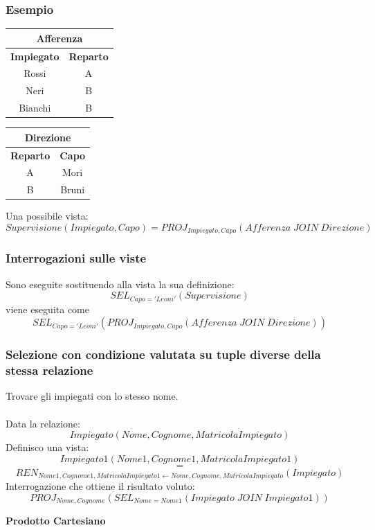 \documentclass[../main.tex]{subfiles}
\begin{document}
	\subsubsection{Esempio}
	\begin{center}
		\begin{tabular}{ |c|c| }
			\hline
			\multicolumn{2}{|c|}{Afferenza}\\
			\hline
			\textbf{Impiegato} & \textbf{Reparto} \\
			\hline
			Rossi & A\\
			Neri & B\\
			Bianchi & B\\
			\hline
		\end{tabular}
		\begin{tabular}{ |c|c| }
			\hline
			\multicolumn{2}{|c|}{Direzione}\\
			\hline
			\textbf{Reparto} & \textbf{Capo} \\
			\hline
			A & Mori\\
			B & Bruni\\
			\hline
		\end{tabular}
	\end{center}
	Una possibile vista:
	\[Supervisione(Impiegato, Capo) = PROJ_{Impiegato,Capo} (Afferenza \; JOIN \; Direzione)\]
	\subsubsection{Interrogazioni sulle viste}
	Sono eseguite sostituendo alla vista la sua definizione:
	\[SEL_{Capo = 'Leoni'} (Supervisione)\]
	viene eseguita come
	\[SEL_{Capo = 'Leoni'} (PROJ_{Impiegato, Capo} (Afferenza \; JOIN \; Direzione))\]
	\subsubsection{Selezione con condizione valutata su tuple diverse della stessa relazione}
	Trovare gli impiegati con lo stesso nome.\\\\
	Data la relazione:
	\[Impiegato (Nome, Cognome, MatricolaImpiegato)\]
	Definisco una vista:
	\[Impiegato1 (Nome1, Cognome1, MatricolaImpiegato1)\] 
	\[=\] 
	\[REN_{Nome1, Cognome1, MatricolaImpiegato1 \leftarrow Nome, Cognome, MatricolaImpiegato} (Impiegato)\]
	Interrogazione che ottiene il risultato voluto:
	\[PROJ_{Nome, Cognome} (SEL_{Nome = Nome1} (Impiegato \; JOIN \; Impiegato1))\]
	\begin{center}
		\textbf{Prodotto Cartesiano}
	\end{center}
\end{document}
